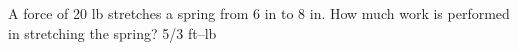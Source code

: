 {A force of 20 lb stretches a spring from 6 in to 8 in. How much work is performed in stretching the spring?}
{5/3 ft--lb}
